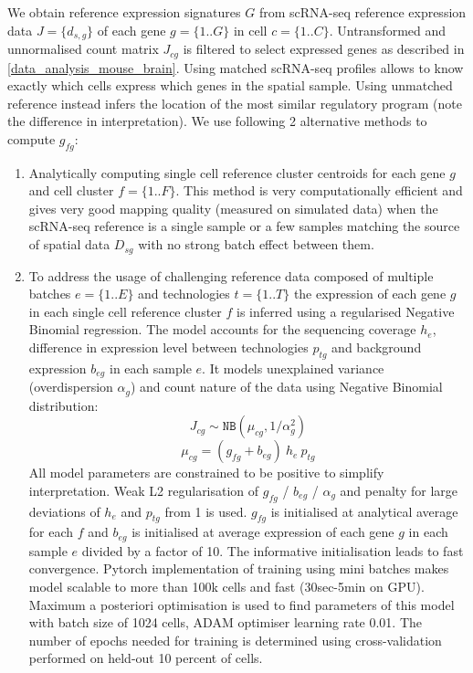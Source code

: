 \documentclass[11pt,a4paper]{article}
\begin{document}
We obtain reference expression signatures $G$ from scRNA-seq reference expression data $J=\{d_{s,g}\}$ of each gene $g=\{1..G\}$ in cell $c=\{1..C\}$. Untransformed and unnormalised count matrix $J_{cg}$ is filtered to select expressed genes as described in \ref{data_analysis_mouse_brain}. Using matched scRNA-seq profiles allows to know exactly which cells express which genes in the spatial sample. Using unmatched reference instead infers the location of the most similar regulatory program (note the difference in interpretation). We use following 2 alternative methods to compute $g_{fg}$:
\begin{enumerate}
    \item Analytically computing single cell reference cluster centroids for each gene $g$ and cell cluster $f=\{1..F\}$. This method is very computationally efficient and gives very good mapping quality (measured on simulated data) when the scRNA-seq reference is a single sample or a few samples matching the source of spatial data $D_{sg}$ with no strong batch effect between them.
    \item To address the usage of challenging reference data composed of multiple batches $e=\{1..E\}$ and technologies $t=\{1..T\}$ the expression of each gene $g$ in each single cell reference cluster $f$ is inferred using a regularised Negative Binomial regression. The model accounts for the sequencing coverage $h_e$, difference in expression level between technologies $p_{tg}$ and background expression $b_{eg}$ in each sample $e$. It models unexplained variance (overdispersion $\alpha_g$) and count nature of the data using Negative Binomial distribution:
    \begin{equation} \label{eq:c2l_ref_prog:1}
    J_{cg} \sim \mathtt{NB}(\mu_{cg}, 1 / \alpha_g^2)
    \end{equation}
    \begin{equation} \label{eq:c2l_ref_prog:2}
    \mu_{cg} = (g_{fg} + b_{eg}) \: {h_e} \: p_{tg}
    \end{equation}
    All model parameters are constrained to be positive to simplify interpretation. Weak L2 regularisation of $g_{fg}$ / $b_{eg}$ / $\alpha_g$ and penalty for large deviations of $h_e$ and $p_{tg}$ from 1 is used. $g_{fg}$ is initialised at analytical average for each $f$ and $b_{eg}$ is initialised at average expression of each gene $g$ in each sample $e$ divided by a factor of 10. The informative initialisation leads to fast convergence.  \newline
    Pytorch implementation of training using mini batches makes model scalable to more than 100k cells and fast (30sec-5min on GPU). Maximum a posteriori optimisation is used to find parameters of this model with batch size of 1024 cells, ADAM optimiser learning rate 0.01. The number of epochs needed for training is determined using cross-validation performed on held-out 10 percent of cells. \newline

\end{enumerate}
\end{document}
